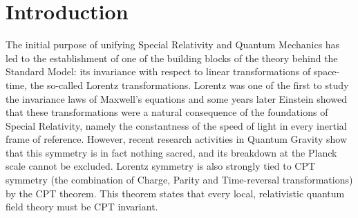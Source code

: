 \section*{Introduction}

	The initial purpose of unifying Special Relativity and Quantum Mechanics has led to the establishment of one of the building blocks of the theory behind the Standard Model: its invariance with respect to linear transformations of space-time, the so-called Lorentz transformations. Lorentz was one of the first to study the invariance laws of Maxwell's equations and some years later Einstein showed that these transformations were a natural consequence of the foundations of Special Relativity, namely the constantness of the speed of light in every inertial frame of reference. However, recent research activities in Quantum Gravity show that this symmetry is in fact nothing sacred, and its breakdown at the Planck scale cannot be excluded. Lorentz symmetry is also strongly tied to CPT symmetry (the combination of Charge, Parity and Time-reversal transformations) by the CPT theorem. This theorem states that every local, relativistic quantum field theory must be CPT invariant.

